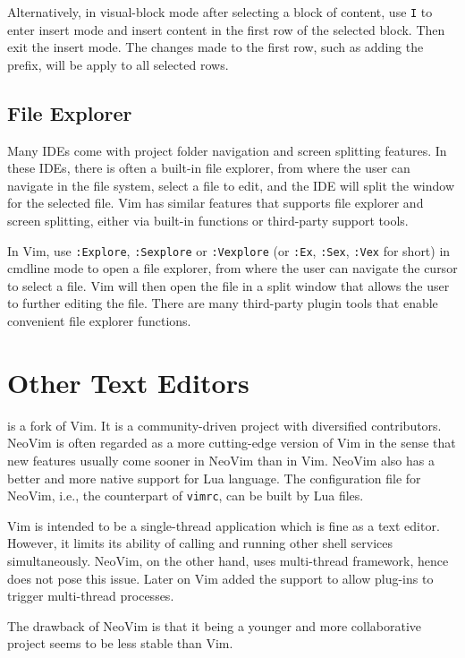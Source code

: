 Alternatively, in visual-block mode after selecting a block of content, use \verb|I| to enter insert mode and insert content in the first row of the selected block. Then exit the insert mode. The changes made to the first row, such as adding the prefix, will be apply to all selected rows.

\subsection{File Explorer}

Many IDEs come with project folder navigation and screen splitting features. In these IDEs, there is often a built-in file explorer, from where the user can navigate in the file system, select a file to edit, and the IDE will split the window for the selected file. Vim has similar features that supports file explorer and screen splitting, either via built-in functions or third-party support tools.

In Vim, use \verb|:Explore|, \verb|:Sexplore| or \verb|:Vexplore| (or \verb|:Ex|, \verb|:Sex|, \verb|:Vex| for short) in cmdline mode to open a file explorer, from where the user can navigate the cursor to select a file. Vim will then open the file in a split window that allows the user to further editing the file. There are many third-party plugin tools that enable convenient file explorer functions.

\section{Other Text Editors}

 is a fork of Vim. It is a community-driven project with diversified contributors. NeoVim is often regarded as a more cutting-edge version of Vim in the sense that new features usually come sooner in NeoVim than in Vim. NeoVim also has a better and more native support for Lua language. The configuration file for NeoVim, i.e., the counterpart of \verb|vimrc|, can be built by Lua files. 

Vim is intended to be a single-thread application which is fine as a text editor. However, it limits its ability of calling and running other shell services simultaneously. NeoVim, on the other hand, uses multi-thread framework, hence does not pose this issue. Later on Vim added the support to allow plug-ins to trigger multi-thread processes.

The drawback of NeoVim is that it being a younger and more collaborative project seems to be less stable than Vim.

